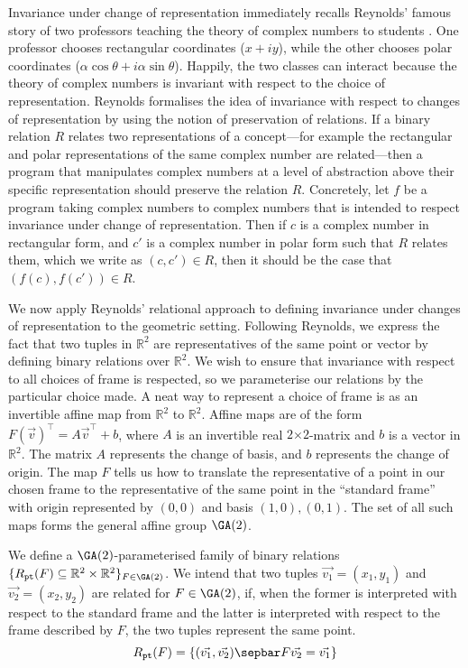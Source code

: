 Invariance under change of representation immediately recalls
Reynolds' famous story of two professors teaching the theory of
complex numbers to students \cite{reynolds83types}. One professor
chooses rectangular coordinates ($x + iy$), while the other chooses
polar coordinates ($\alpha\cos\theta + i\alpha\sin\theta$). Happily,
the two classes can interact because the theory of complex numbers is
invariant with respect to the choice of representation. Reynolds
formalises the idea of invariance with respect to changes of
representation by using the notion of preservation of relations. If a
binary relation $R$ relates two representations of a concept---for
example the rectangular and polar representations of the same complex
number are related---then a program that manipulates complex numbers
at a level of abstraction above their specific representation should
preserve the relation $R$. Concretely, let $f$ be a program taking
complex numbers to complex numbers that is intended to respect
invariance under change of representation. Then if $c$ is a complex
number in rectangular form, and $c'$ is a complex number in polar form
such that $R$ relates them, which we write as $(c,c') \in R$, then it
should be the case that $(f(c), f(c')) \in R$.

We now apply Reynolds' relational approach to defining invariance
under changes of representation to the geometric setting. Following
Reynolds, we express the fact that two tuples in $\mathbb{R}^2$ are
representatives of the same point or vector by defining binary
relations over $\mathbb{R}^2$. We wish to ensure that invariance with
respect to all choices of frame is respected, so we parameterise our
relations by the particular choice made. A neat way to represent a
choice of frame is as an invertible affine map from $\mathbb{R}^2$ to
$\mathbb{R}^2$. Affine maps are of the form $F(\vec{v})^\top =
A\vec{v}^\top + b$, where $A$ is an invertible real $2 \mathord\times
2$-matrix and $b$ is a vector in $\mathbb{R}^2$. The matrix $A$
represents the change of basis, and $b$ represents the change of
origin. The map $F$ tells us how to translate the representative of a
point in our chosen frame to the representative of the same point in
the ``standard frame'' with origin represented by $(0,0)$ and basis
$(1,0),(0,1)$. The set of all such maps forms the general affine group
$\GA(2)$.

We define a $\GA(2)$-parameterised family of binary relations $\{
R_{\texttt{pt}}(F) \subseteq \mathbb{R}^2 \times \mathbb{R}^2 \}_{F
  \in \GA(2)}$. We intend that two tuples $\vec{v_1} = (x_1,y_1)$ and
$\vec{v_2} = (x_2,y_2)$ are related for $F \in \GA(2)$, if, when the
former is interpreted with respect to the standard frame and the
latter is interpreted with respect to the frame described by $F$, the
two tuples represent the same point.
\begin{displaymath}
  R_{\texttt{pt}}(F) = \{ (\vec{v_1}, \vec{v_2}) \sepbar F\vec{v_2} = \vec{v_1} \}
\end{displaymath}

